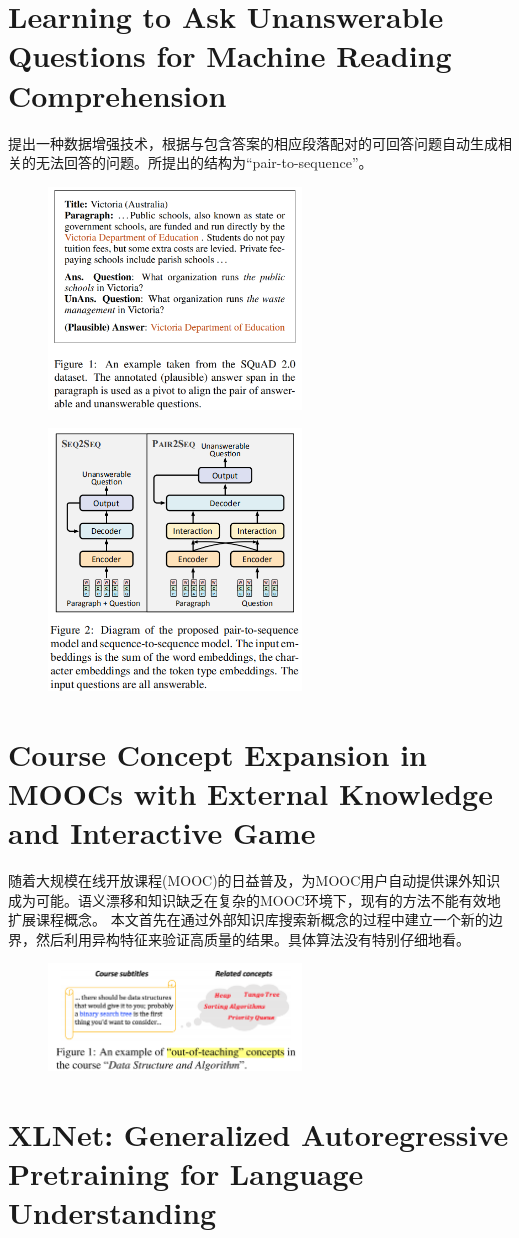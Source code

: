 \documentclass[a4paper,UTF8]{article}
\numberwithin{equation}{section}
\begin{document}
\newpage
\section{Learning to Ask Unanswerable Questions for Machine Reading Comprehension}
提出一种数据增强技术，根据与包含答案的相应段落配对的可回答问题自动生成相关的无法回答的问题。所提出的结构为“pair-to-sequence”。
\begin{figure}[H]
	\centering
	\includegraphics[width=0.6\textwidth]{3-1.png}
\end{figure}
\begin{figure}[H]
	\centering
	\includegraphics[width=0.6\textwidth]{3-2.png}
\end{figure}

\newpage
\section{Course Concept Expansion in MOOCs with External Knowledge and Interactive Game}
随着大规模在线开放课程(MOOC)的日益普及，为MOOC用户自动提供课外知识成为可能。语义漂移和知识缺乏在复杂的MOOC环境下，现有的方法不能有效地扩展课程概念。
本文首先在通过外部知识库搜索新概念的过程中建立一个新的边界，然后利用异构特征来验证高质量的结果。具体算法没有特别仔细地看。
\begin{figure}[H]
	\centering
	\includegraphics[width=0.6\textwidth]{4-1.png}
\end{figure}

\newpage
\section{XLNet: Generalized Autoregressive Pretraining for Language Understanding}
\end{document}
